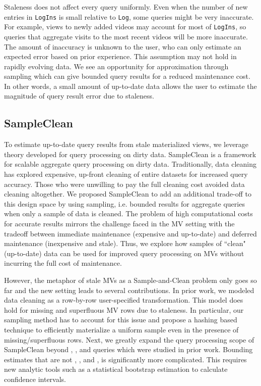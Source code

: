 Staleness does not affect every query uniformly.
Even when the number of new entries in \texttt{LogIns} is small relative to \texttt{Log}, some queries might be very inaccurate.
For example, views to newly added videos may account for most of \texttt{LogIns}, so queries that aggregate visits to the most recent videos will be more inaccurate.
The amount of inaccuracy is unknown to the user, who can only estimate an expected error based on prior experience.
This assumption may not hold in rapidly evolving data.
We see an opportunity for approximation through sampling which can give bounded query results for a reduced maintenance cost.
In other words, a small amount of up-to-date data allows the user to estimate the magnitude of query result error due to staleness.

\subsection{SampleClean~\cite{wang1999sample}}
To estimate up-to-date query results from stale materialized views, we leverage theory developed for query processing on dirty data.
SampleClean is a framework for scalable aggregate query processing on dirty data.
Traditionally, data cleaning has explored expensive, up-front cleaning of entire datasets for increased query accuracy.
Those who were unwilling to pay the full cleaning cost avoided data cleaning altogether.
We proposed SampleClean to add an additional trade-off to this design space by using sampling, i.e. bounded results for aggregate queries when only a sample of data is cleaned.
The problem of high computational costs for accurate results mirrors the challenge faced in the MV setting with the tradeoff between immediate maintenance (expensive and up-to-date) and deferred maintenance (inexpensive and stale). 
Thus, we explore how samples of ``clean" (up-to-date) data can be used for improved query processing on MVs without incurring the full cost of maintenance.

However, the metaphor of stale MVs as a Sample-and-Clean problem only goes so far and the new setting leads to several contributions.
In prior work, we modeled data cleaning as a row-by-row user-specified transformation.
This model does hold for missing and superfluous MV rows due to staleness.
In particular, our sampling method has to account for this issue and propose a hashing based technique to efficiently materialize a uniform sample even in the presence of missing/superfluous rows.
Next, we greatly expand the query processing scope of SampleClean beyond \sumfunc, \countfunc, and \avgfunc queries which were studied in prior work.
Bounding estimates that are not \sumfunc, \countfunc, and \avgfunc, is significantly more complicated.
This requires new analytic tools such as a statistical bootstrap estimation to calculate confidence intervals.


